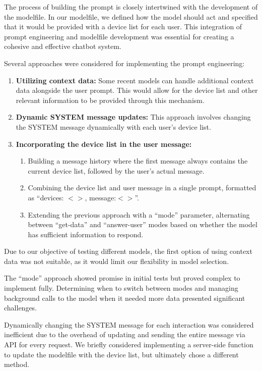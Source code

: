 The process of building the prompt is closely intertwined with the development of the modelfile. In our modelfile, we defined how the model should act and specified that it would be provided with a device list for each user. This integration of prompt engineering and modelfile development was essential for creating a cohesive and effective chatbot system.

Several approaches were considered for implementing the prompt engineering:

\begin{enumerate}
    \item \textbf{Utilizing context data:} Some recent models can handle additional context data alongside the user prompt. This would allow for the device list and other relevant information to be provided through this mechanism.

    \item \textbf{Dynamic SYSTEM message updates:} This approach involves changing the SYSTEM message dynamically with each user's device list.

    \item \textbf{Incorporating the device list in the user message:}
    \begin{enumerate}
        \item Building a message history where the first message always contains the current device list, followed by the user's actual message.
        \item Combining the device list and user message in a single prompt, formatted as ``devices: $<>$, message:$<>$''.
        \item Extending the previous approach with a ``mode'' parameter, alternating between ``get-data'' and ``answer-user'' modes based on whether the model has sufficient information to respond.
    \end{enumerate}
\end{enumerate}

Due to our objective of testing different models, the first option of using context data was not suitable, as it would limit our flexibility in model selection.

The ``mode'' approach showed promise in initial tests but proved complex to implement fully. Determining when to switch between modes and managing background calls to the model when it needed more data presented significant challenges.

Dynamically changing the SYSTEM message for each interaction was considered inefficient due to the overhead of updating and sending the entire message via API for every request. We briefly considered implementing a server-side function to update the modelfile with the device list, but ultimately chose a different method.


